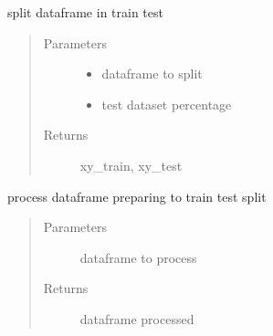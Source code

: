 \documentclass[letterpaper,10pt,english]{sphinxmanual}
\begin{document}
\begin{fulllineitems}
\label{\detokenize{algorithms:algorithms.ird.ird_trainer.__create_train_test}}
\sphinxAtStartPar
split dataframe in train test
\begin{quote}\begin{description}
\item[{Parameters}] \leavevmode\begin{itemize}
\item {} 
\sphinxAtStartPar
{} \textendash{} dataframe to split

\item {} 
\sphinxAtStartPar
{} \textendash{} test dataset percentage

\end{itemize}

\item[{Returns}] \leavevmode
\sphinxAtStartPar
xy\_train, xy\_test

\end{description}\end{quote}

\end{fulllineitems}


\begin{fulllineitems}
\label{\detokenize{algorithms:algorithms.ird.ird_trainer.__do_processing}}
\sphinxAtStartPar
process dataframe preparing to train test split
\begin{quote}\begin{description}
\item[{Parameters}] \leavevmode
\sphinxAtStartPar
{} \textendash{} dataframe to process

\item[{Returns}] \leavevmode
\sphinxAtStartPar
dataframe processed

\end{description}\end{quote}

\end{fulllineitems}
\end{document}
